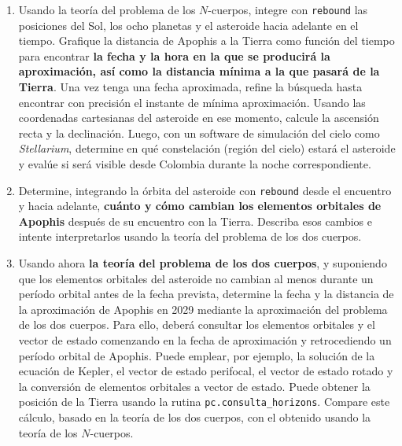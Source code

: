 \documentclass[a4paper]{article}
\begin{document}
\begin{enumerate}[leftmargin=*]
    \item Usando la teoría del problema de los $N$-cuerpos, integre con \texttt{rebound} las posiciones del Sol, los ocho planetas y el asteroide hacia adelante en el tiempo. Grafique la distancia de Apophis a la Tierra como función del tiempo para encontrar \textbf{la fecha y la hora en la que se producirá la aproximación, así como la distancia mínima a la que pasará de la Tierra}. Una vez tenga una fecha aproximada, refine la búsqueda hasta encontrar con precisión el instante de mínima aproximación. Usando las coordenadas cartesianas del asteroide en ese momento, calcule la ascensión recta y la declinación. Luego, con un software de simulación del cielo como \textit{Stellarium}, determine en qué constelación (región del cielo) estará el asteroide y evalúe si será visible desde Colombia durante la noche correspondiente.

    \item Determine, integrando la órbita del asteroide con \texttt{rebound} desde el encuentro y hacia adelante, \textbf{cuánto y cómo cambian los elementos orbitales de Apophis} después de su encuentro con la Tierra. Describa esos cambios e intente interpretarlos usando la teoría del problema de los dos cuerpos.

    \item Usando ahora \textbf{la teoría del problema de los dos cuerpos}, y suponiendo que los elementos orbitales del asteroide no cambian al menos durante un período orbital antes de la fecha prevista, determine la fecha y la distancia de la aproximación de Apophis en 2029 mediante la aproximación del problema de los dos cuerpos. Para ello, deberá consultar los elementos orbitales y el vector de estado comenzando en la fecha de aproximación y retrocediendo un período orbital de Apophis. Puede emplear, por ejemplo, la solución de la ecuación de Kepler, el vector de estado perifocal, el vector de estado rotado y la conversión de elementos orbitales a vector de estado. Puede obtener la posición de la Tierra usando la rutina \texttt{pc.consulta\_horizons}. Compare este cálculo, basado en la teoría de los dos cuerpos, con el obtenido usando la teoría de los $N$-cuerpos.


\end{enumerate}
\end{document}
